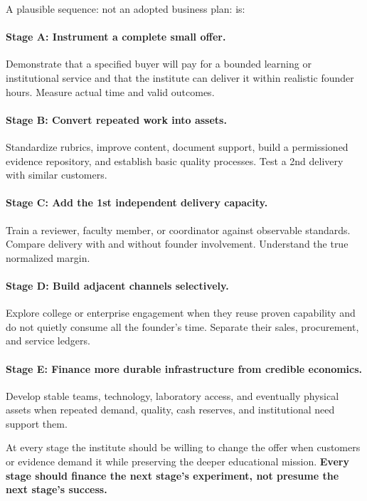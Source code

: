 A plausible sequence: not an adopted business plan: is:

\paragraph*{Stage A: Instrument a complete small offer.} Demonstrate that a specified buyer will pay for a bounded learning or institutional service and that the institute can deliver it within realistic founder hours. Measure actual time and valid outcomes.

\paragraph*{Stage B: Convert repeated work into assets.} Standardize rubrics, improve content, document support, build a permissioned evidence repository, and establish basic quality processes. Test a 2nd delivery with similar customers.

\paragraph*{Stage C: Add the 1st independent delivery capacity.} Train a reviewer, faculty member, or coordinator against observable standards. Compare delivery with and without founder involvement. Understand the true normalized margin.

\paragraph*{Stage D: Build adjacent channels selectively.} Explore college or enterprise engagement when they reuse proven capability and do not quietly consume all the founder's time. Separate their sales, procurement, and service ledgers.

\paragraph*{Stage E: Finance more durable infrastructure from credible economics.} Develop stable teams, technology, laboratory access, and eventually physical assets when repeated demand, quality, cash reserves, and institutional need support them.

At every stage the institute should be willing to change the offer when customers or evidence demand it while preserving the deeper educational mission. \textbf{Every stage should finance the next stage's experiment, not presume the next stage's success.}
